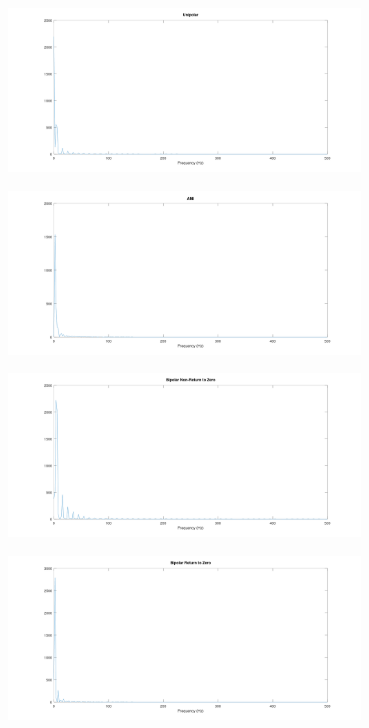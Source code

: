 \begin{enumerate}
        \begin{center}
            \centering
            \includegraphics[width=0.7\textwidth]{../octave/coding/spectre/unipolar.png}
            \label{img:coding-spectre-unipolar}
        \end{center}
        \begin{center}
            \centering
            \includegraphics[width=0.7\textwidth]{../octave/coding/spectre/ami.png}
            \label{img:coding-spectre-ami}
        \end{center}
        \begin{center}
            \centering
            \includegraphics[width=0.7\textwidth]{../octave/coding/spectre/bipolarnrz.png}
            \label{img:coding-spectre-nrz}
        \end{center}
        \begin{center}
            \centering
            \includegraphics[width=0.7\textwidth]{../octave/coding/spectre/bipolarrz.png}

\end{center}
\end{enumerate}
